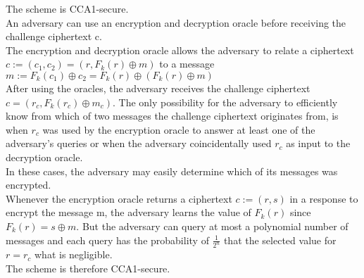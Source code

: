 The scheme is CCA1-secure.\\
An adversary can use an encryption and decryption oracle before receiving the challenge ciphertext c.\\
The encryption and decryption oracle allows the adversary to relate a ciphertext $c := (c_{1}, c_{2}) = (r, F_{k}(r) \oplus m)$ to a message $m := F_{k}(c_{1}) \oplus c_{2} = F_{k}(r)\oplus (F_{k}(r) \oplus m)$\\
After using the oracles, the adversary receives the challenge ciphertext $c = (r_{c}, F_{k}(r_{c})\oplus m_{c})$.
The only possibility for the adversary to efficiently know from which of two messages the challenge ciphertext originates from, is when $r_{c}$ was used by the encryption oracle to answer at least one of the adversary's queries or when the adversary coincidentally used $r_{c}$ as input to the decryption oracle.\\
In these cases, the adversary may easily determine which of its messages was encrypted.\\
Whenever the encryption oracle returns a ciphertext $c := (r,s)$ in a response to encrypt the message m, the adversary learns the value of $F_{k}(r)$ since $F_{k}(r) = s\oplus m$.
But the adversary can query at most a polynomial number of messages and each query has the probability of $\frac{1}{2^{n}}$ that the selected value for $r = r_{c}$ what is negligible.\\
The scheme is therefore CCA1-secure.

